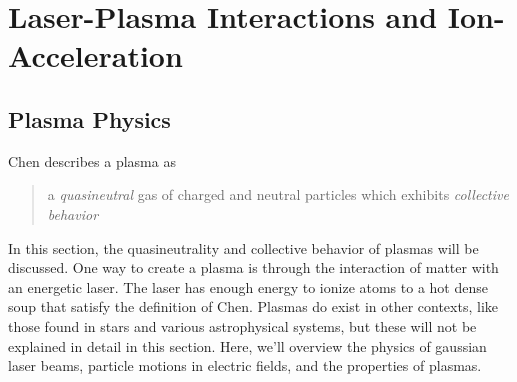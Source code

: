 \chapter{Laser-Plasma Interactions and Ion-Acceleration} \label{ch:2}


\section{Plasma Physics}

Chen\cite{Chen_2015_Plasma} describes a plasma as

\begin{quote}
	a \emph{quasineutral} gas of charged and neutral particles which exhibits \emph{collective behavior}
\end{quote}
In this section, the quasineutrality and collective behavior of plasmas will be discussed. One way to create a plasma is through the interaction of matter with an energetic laser. The laser has enough energy to ionize atoms to a hot dense soup that satisfy the definition of Chen. Plasmas do exist in other contexts, like those found in stars and various astrophysical systems, but these will not be explained in detail in this section. Here, we'll overview the physics of gaussian laser beams, particle motions in electric fields, and the properties of plasmas.

%
%
%

